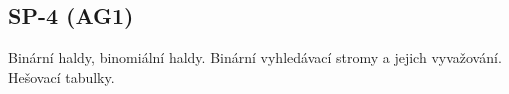 \subsection{SP-4 (AG1)}
Binární haldy, binomiální haldy. Binární vyhledávací stromy a jejich vyvažování. Hešovací tabulky.

